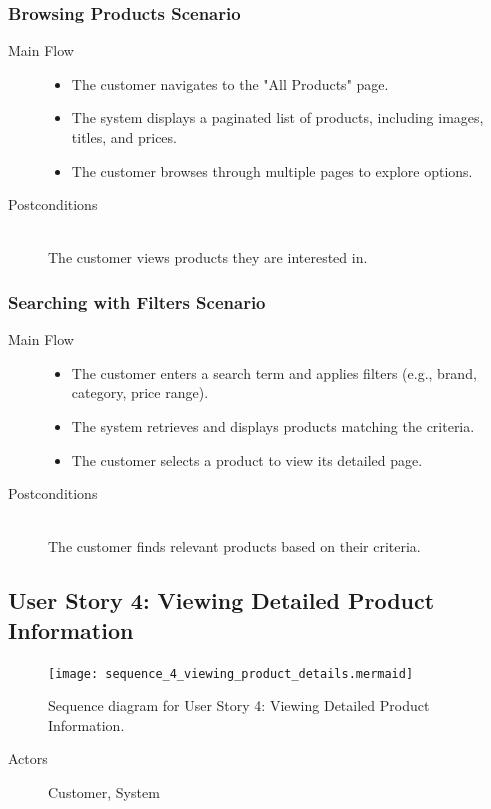 \documentclass[twoside,a4paper,journal]{IEEEtran}
\begin{document}
\subsubsection{Browsing Products Scenario}
\begin{description}
  \item[Main Flow] \hfill
    \begin{itemize}
      \item The customer navigates to the "All Products" page.
      \item The system displays a paginated list of products,
        including images, titles, and prices.
      \item The customer browses through multiple pages to explore options.
    \end{itemize}
  \item[Postconditions] \hfill \\
    The customer views products they are interested in.
\end{description}
\subsubsection{Searching with Filters Scenario}
\begin{description}
  \item[Main Flow] \hfill
    \begin{itemize}
      \item The customer enters a search term and applies filters
        (e.g., brand, category, price range).
      \item The system retrieves and displays products matching the criteria.
      \item The customer selects a product to view its detailed page.
    \end{itemize}
  \item[Postconditions] \hfill \\
    The customer finds relevant products based on their criteria.
\end{description}

\subsection{User Story 4: Viewing Detailed Product Information}
\begin{figure}[!t]
\centering
\texttt{[image: sequence\_4\_viewing\_product\_details.mermaid]}
\caption{Sequence diagram for User Story 4: Viewing Detailed Product Information.}
\label{fig:sequence_4}
\end{figure}
\begin{description}
  \item[Actors] Customer, System
\end{description}
\end{document}
